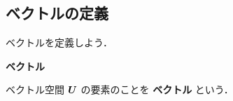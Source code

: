             \subsection{ベクトルの定義}
                ベクトルを定義しよう．
                \\
                \begin{itembox}[l]{\textbf{ベクトル}}
                    \begin{dfn}
                        ベクトル空間 $\boldsymbol{U}$ の要素のことを \textbf{ベクトル} という．
                    \end{dfn}
                \end{itembox}
                \\
